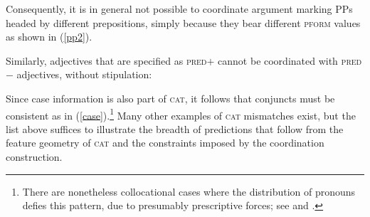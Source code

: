 \documentclass[output=paper
                ,modfonts
                ,nonflat
	        ,collection
	        ,collectionchapter
	        ,collectiontoclongg
 	        ,biblatex
                ,babelshorthands
                ,newtxmath
                ,draftmode
                ,colorlinks, citecolor=brown
]{./langsci/langscibook}
\begin{document}
\begin{exe}
\ex
\begin{xlista}
\end{xlista}\label{pp}
\end{exe}

\noindent
Consequently, it is in general not possible to coordinate argument marking PPs headed by different prepositions, simply because they bear
different \textsc{pform} values as shown in (\ref{pp2}).

\begin{exe}
\ex
\begin{xlista}

\end{xlista}\label{pp2}
\end{exe}

Similarly, adjectives that are specified as \textsc{pred}$+$ cannot be
coordinated with  \textsc{pred}$-$ adjectives, without stipulation:

\begin{exe}
\ex
\begin{xlista}
 \end{xlista}
\end{exe}


\noindent
Since case information is also part of \textsc{cat}, it follows that conjuncts must be consistent as in (\ref{case}).\footnote{There are nonetheless collocational cases where the distribution of pronouns defies this pattern, due to presumably prescriptive forces; see \citet{grano} and \citet{binomial}.} Many other examples of \textsc{cat} mismatches exist, but the  list above suffices to
illustrate the breadth of predictions that follow from the feature geometry of \textsc{cat} and the constraints imposed by
the coordination construction.
\end{document}

